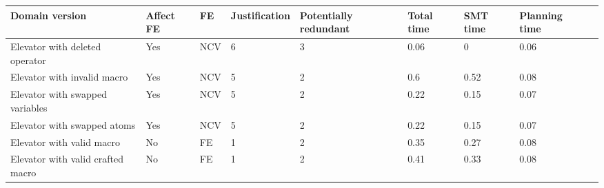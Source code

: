 \begin{table}[] 
\begin{tabular}{|l|l|l|l|l|l|l|l|l|} 
\hline 
\textbf{Domain version}  & \textbf{Affect FE} & \textbf{FE} & \textbf{Justification} &  \textbf{Potentially redundant} & \textbf{Total time}  & \textbf{SMT time}  & \textbf{Planning time}    \\ \hline 
Elevator with deleted operator & Yes & NCV & 6 & 3 & 0.06 & 0 & 0.06 \\  \hline
Elevator with invalid macro & Yes & NCV & 5 & 2 & 0.6 & 0.52 & 0.08 \\  \hline
Elevator with swapped variables & Yes & NCV & 5 & 2 & 0.22 & 0.15 & 0.07 \\  \hline
Elevator with swapped atoms & Yes & NCV & 5 & 2 & 0.22 & 0.15 & 0.07 \\  \hline
Elevator with valid macro & No & FE & 1 & 2 & 0.35 & 0.27 & 0.08 \\  \hline
Elevator with valid crafted macro & No & FE & 1 & 2 & 0.41 & 0.33 & 0.08 \\  \hline
\end{tabular} 
\end{table} 
